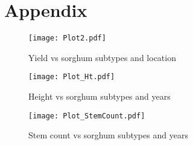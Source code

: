 \section*{Appendix} \label{Appendix}

\begin{figure}[H]
\centering
\texttt{[image: Plot2.pdf]}
\caption{Yield vs sorghum subtypes and location}
\label{fig:Fig4}
\end{figure}

\begin{figure}[H]
\centering
\texttt{[image: Plot\_Ht.pdf]}
\caption{Height vs sorghum subtypes and years}
\label{fig:Fig9}
\end{figure}

\begin{figure}[H]
\centering
\texttt{[image: Plot\_StemCount.pdf]}
\caption{Stem count vs sorghum subtypes and years}
\label{fig:Fig10}
\end{figure}

